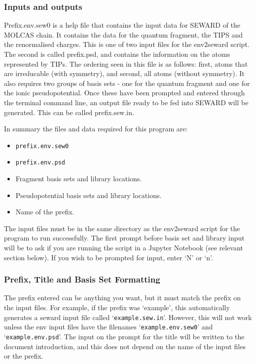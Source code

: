 \documentclass[10pt]{article}
\begin{document}
\subsubsection{Inputs and outputs}
Prefix.env.sew0 is a help file that contains the input data for SEWARD of the MOLCAS chain. It contains the data for the quantum fragment, the TIPS and the renormalised charges. This is one of two input files for the env2seward script. The second is called prefix.psd, and contains the information on the atoms represented by TIPs. The ordering seen in this file is as follows: first, atoms that are irreducable (with symmetry), and second, all atoms (without symmetry). It also requires two groups of basis sets - one for the quantum fragment and one for the ionic pseudopotential. Once these have been prompted and entered through the terminal command line, an output file ready to be fed into SEWARD will be generated. This can be called prefix.sew.in.

In summary the files and data required for this program are:
\begin{itemize}
	\item \texttt{prefix.env.sew0}
	\item \texttt{prefix.env.psd}
	\item Fragment basis sets and library locations.
	\item Pseudopotential basis sets and library locations.
	\item Name of the prefix.
\end{itemize}
The input files must be in the same directory as the env2seward script for the program to run successfully. The first prompt before basis set and library input will be to ask if you are running the script in a Jupyter Notebook (see relevant section below). If you wish to be prompted for input, enter `N' or `n'. 

\subsubsection{Prefix, Title and Basis Set Formatting}

The prefix entered can be anything you want, but it must match the prefix on the input files. For example, if the prefix was `example', this automatically generates a seward input file called `\texttt{example.sew.in}'. However, this will not work unless the env input files have the filenames `\texttt{example.env.sew0}' and `\texttt{example.env.psd}'. The input on the prompt for the title will be written to the document introduction, and this does not depend on the name of the input files or the prefix.
\end{document}
